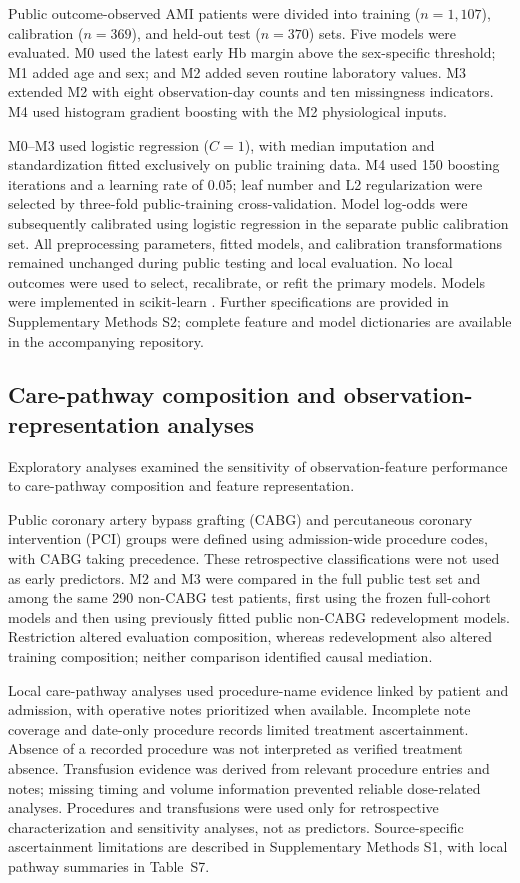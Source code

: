 \documentclass[pdflatex,sn-mathphys-num]{sn-jnl}%
\theoremstyle{thmstyleone}%
\theoremstyle{thmstyletwo}%
\theoremstyle{thmstylethree}%
\begin{document}
Public outcome-observed AMI patients were divided into training ($n=1,107$), calibration ($n=369$), and held-out test ($n=370$) sets. Five models were evaluated. M0 used the latest early Hb margin above the sex-specific threshold; M1 added age and sex; and M2 added seven routine laboratory values. M3 extended M2 with eight observation-day counts and ten missingness indicators. M4 used histogram gradient boosting with the M2 physiological inputs.

M0--M3 used logistic regression ($C=1$), with median imputation and standardization fitted exclusively on public training data. M4 used 150 boosting iterations and a learning rate of 0.05; leaf number and L2 regularization were selected by three-fold public-training cross-validation. Model log-odds were subsequently calibrated using logistic regression in the separate public calibration set. All preprocessing parameters, fitted models, and calibration transformations remained unchanged during public testing and local evaluation. No local outcomes were used to select, recalibrate, or refit the primary models. Models were implemented in scikit-learn \cite{sklearn2011}. Further specifications are provided in Supplementary Methods S2; complete feature and model dictionaries are available in the accompanying repository.

\subsection{Care-pathway composition and observation-representation analyses}

Exploratory analyses examined the sensitivity of observation-feature performance to care-pathway composition and feature representation.

Public coronary artery bypass grafting (CABG) and percutaneous coronary intervention (PCI) groups were defined using admission-wide procedure codes, with CABG taking precedence. These retrospective classifications were not used as early predictors. M2 and M3 were compared in the full public test set and among the same 290 non-CABG test patients, first using the frozen full-cohort models and then using previously fitted public non-CABG redevelopment models. Restriction altered evaluation composition, whereas redevelopment also altered training composition; neither comparison identified causal mediation.

Local care-pathway analyses used procedure-name evidence linked by patient and admission, with operative notes prioritized when available. Incomplete note coverage and date-only procedure records limited treatment ascertainment. Absence of a recorded procedure was not interpreted as verified treatment absence. Transfusion evidence was derived from relevant procedure entries and notes; missing timing and volume information prevented reliable dose-related analyses. Procedures and transfusions were used only for retrospective characterization and sensitivity analyses, not as predictors. Source-specific ascertainment limitations are described in Supplementary Methods S1, with local pathway summaries in Table~S7.
\end{document}

